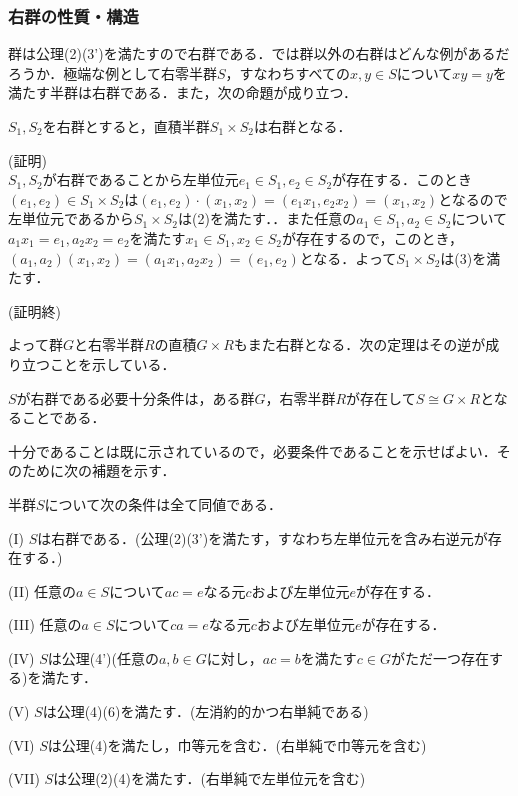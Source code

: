 \documentclass{jsarticle}
\begin{document}
\subsubsection{右群の性質・構造}
群は公理(2)(3')を満たすので右群である．では群以外の右群はどんな例があるだろうか．極端な例として右零半群$S$，すなわちすべての$x,y\in S$について$xy=y$を満たす半群は右群である．また，次の命題が成り立つ．
\begin{prop}
$S_1,S_2$を右群とすると，直積半群$S_1\times S_2$は右群となる．
\end{prop}
(証明)\\
$S_1,S_2$が右群であることから左単位元$e_1\in S_1,e_2\in S_2$が存在する．このとき$(e_1,e_2)\in S_1\times S_2$は$(e_1,e_2)\cdot(x_1,x_2)=(e_1x_1,e_2x_2)=(x_1,x_2)$となるので左単位元であるから$S_1\times S_2$は(2)を満たす．．また任意の$a_1\in S_1,a_2\in S_2$について$a_1x_1=e_1,a_2x_2=e_2$を満たす$x_1\in S_1,x_2\in S_2$が存在するので，このとき，$(a_1,a_2)(x_1,x_2)=(a_1x_1,a_2x_2)=(e_1,e_2)$となる．よって$S_1\times S_2$は(3)を満たす．
\begin{flushright}
(証明終)
\end{flushright}
よって群$G$と右零半群$R$の直積$G\times R$もまた右群となる．次の定理はその逆が成り立つことを示している．
\begin{thm}
$S$が右群である必要十分条件は，ある群$G$，右零半群$R$が存在して$S\cong G\times R$となることである．
\end{thm}
十分であることは既に示されているので，必要条件であることを示せばよい．そのために次の補題を示す．
\begin{lem}
半群$S$について次の条件は全て同値である．
\begin{description}
\item{(I)} $S$は右群である．(公理(2)(3')を満たす，すなわち左単位元を含み右逆元が存在する．)
\item{(II)} 任意の$a\in S$について$ac=e$なる元$c$および左単位元$e$が存在する．
\item{(III)} 任意の$a\in S$について$ca=e$なる元$c$および左単位元$e$が存在する．
\item{(IV)} $S$は公理(4')(任意の$a,b\in G$に対し，$ac=b$を満たす$c\in G$がただ一つ存在する)を満たす．
\item{(V)} $S$は公理(4)(6)を満たす．(左消約的かつ右単純である)
\item{(VI)} $S$は公理(4)を満たし，巾等元を含む．(右単純で巾等元を含む)
\item{(VII)} $S$は公理(2)(4)を満たす．(右単純で左単位元を含む)
\end{description}
\end{lem}
\end{document}
